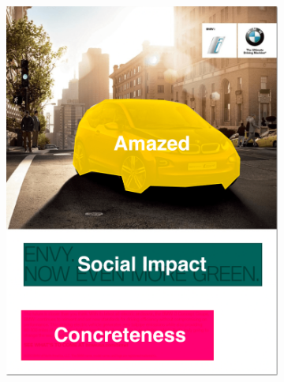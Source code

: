 \documentclass[hidelinks,11pt,a4paper]{report}
\begin{document}
\begin{figure}[!h]
\begin{subfigure}[b]{0.24\textwidth}
         \includegraphics[scale=0.22]{images/Image3_Segment.png}
     \end{subfigure}
     

\end{figure}
\end{document}
